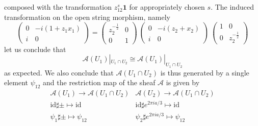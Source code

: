 \documentclass[a4paper,11pt]{article}
\numberwithin{equation}{section}
\begin{document}
composed with the transformation $z_{12}^{s}\mathbf{1}$ for appropriately 
chosen $s$. The induced transformation on the open string morphism, namely
\[
\left(
\begin{array}{cc}
0 & -i(1+z_1 x_1) \\ i & 0
\end{array} \right) = 
\left(
\begin{array}{cc}
z_2^{-\frac{1}{2}} & 0 \\ 0 & 1
\end{array} \right)~
\left(
\begin{array}{cc}
0 & -i(z_2 + x_2) \\ i & 0
\end{array} \right)~
\left(
\begin{array}{cc}
1 & 0 \\ 0 & z_2^{-\frac{1}{2}}
\end{array} \right)
\]
let us conclude that 
\[
\mathcal{A}(U_1)|_{U_{1}\cap U_{2}}\cong \mathcal{A}(U_1)|_{U_{1}\cap U_{2}} 
\]
as expected. We also conclude that $\mathcal{A}(U_1\cap U_2)$ is thus 
generated by a single element $\psi_{12}$ and the restriction map of the sheaf 
$\mathcal{A}$ is given by
\[
\begin{array}{cc}
\mathcal{A}(U_1) \rightarrow \mathcal{A}(U_1\cap U_2) & \mathcal{A}(U_2) 
\rightarrow \mathcal{A}(U_1\cap U_2) \\
\mathrm{id} \sharp \pm \mapsto \mathrm{id} & \mathrm{id} \sharp 
e^{2 \pi i a/3} \mapsto \mathrm{id}  \\
\psi_1 \sharp \pm \mapsto \psi_{12}  & \psi_2 \sharp e^{2 \pi i 
a/3} \mapsto \psi_{12}
\end{array}
\]
\end{document}
